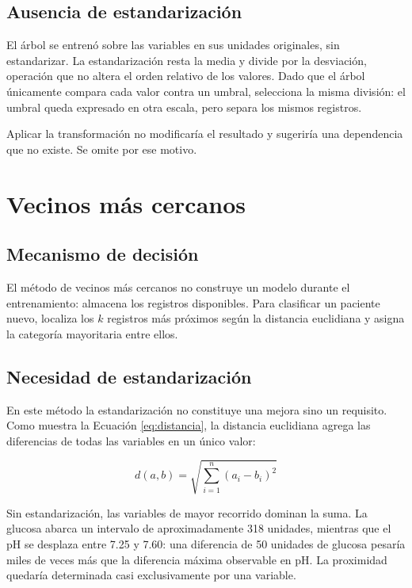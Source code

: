 \documentclass[11pt]{article}
\begin{document}
\subsection{Ausencia de estandarización}

El árbol se entrenó sobre las variables en sus unidades originales, sin estandarizar. La
estandarización resta la media y divide por la desviación, operación que no altera el orden
relativo de los valores. Dado que el árbol únicamente compara cada valor contra un umbral,
selecciona la misma división: el umbral queda expresado en otra escala, pero separa los mismos
registros.

Aplicar la transformación no modificaría el resultado y sugeriría una dependencia que no existe.
Se omite por ese motivo.

\section{Vecinos más cercanos}
\label{sec:vecinos}

\subsection{Mecanismo de decisión}

El método de vecinos más cercanos no construye un modelo durante el entrenamiento: almacena los
registros disponibles. Para clasificar un paciente nuevo, localiza los $k$ registros más próximos
según la distancia euclidiana y asigna la categoría mayoritaria entre ellos.

\subsection{Necesidad de estandarización}

En este método la estandarización no constituye una mejora sino un requisito. Como muestra la
Ecuación \eqref{eq:distancia}, la distancia euclidiana agrega las diferencias de todas las
variables en un único valor:

\begin{equation}
d(a, b) = \sqrt{\sum_{i=1}^{n} (a_i - b_i)^2}
\label{eq:distancia}
\end{equation}

Sin estandarización, las variables de mayor recorrido dominan la suma. La glucosa abarca un
intervalo de aproximadamente 318 unidades, mientras que el pH se desplaza entre 7.25 y 7.60: una
diferencia de 50 unidades de glucosa pesaría miles de veces más que la diferencia máxima
observable en pH. La proximidad quedaría determinada casi exclusivamente por una variable.
\end{document}
